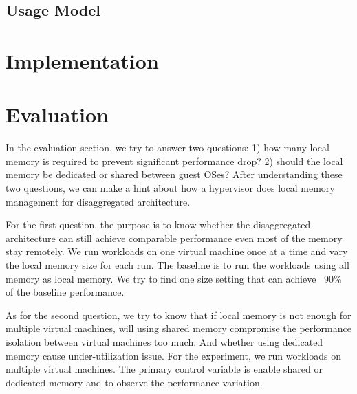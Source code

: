\documentclass[twocolumn]{article}
\begin{document}
\subsection{Usage Model}

\section{Implementation}
\section{Evaluation}
In the evaluation section, we try to answer two questions: 1) how many local memory is required to prevent significant performance drop? 2) should the local memory be dedicated or shared between guest OSes? After understanding these two questions, we can make a hint about how a hypervisor does local memory management for disaggregated architecture.

For the first question, the purpose is to know whether the disaggregated architecture can still achieve comparable performance even most of the memory stay remotely. We run workloads on one virtual machine once at a time and vary the local memory size for each run. The baseline is to run the workloads using all memory as local memory. We try to find one size setting that can achieve ~90\% of the baseline performance.

As for the second question, we try to know that if local memory is not enough for multiple virtual machines, will using shared memory compromise the performance isolation between virtual machines too much. And whether using dedicated memory cause under-utilization issue. For the experiment, we run workloads on multiple virtual machines. The primary control variable is enable shared or dedicated memory and to observe the performance variation.

{}

\end{document}
